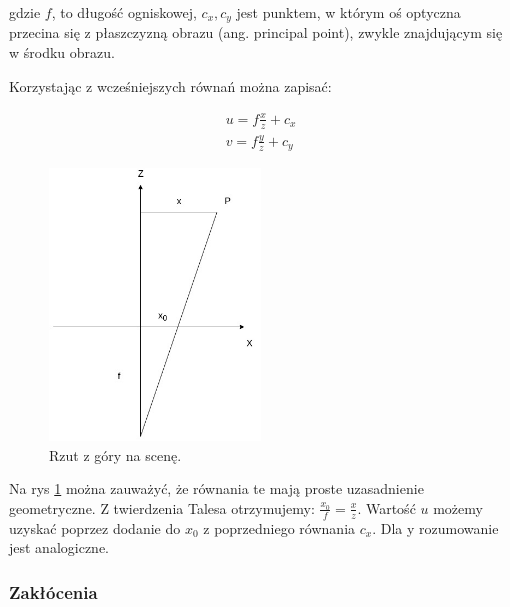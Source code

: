 \documentclass[oneside, eng]{mgr}
\begin{document}
gdzie $f$, to długość ogniskowej, $c_x, c_y$ jest punktem, w którym oś optyczna przecina się z płaszczyzną obrazu (ang. principal point), zwykle znajdującym się w środku obrazu.

Korzystając z wcześniejszych równań można zapisać:

\begin{align*}
	u = f \frac{x}{z} + c_x \\
	v = f \frac{y}{z} + c_y
\end{align*}

\begin{figure}
\centering
	\includegraphics[width=0.50\textwidth]{rzutowanie.jpg}\par\vspace{1cm}
\caption{Rzut z góry na scenę.}
	\label{fig:projection_up}
\end{figure}

Na rys \ref{fig:projection_up} można zauważyć, że równania te mają proste uzasadnienie geometryczne. Z twierdzenia Talesa otrzymujemy: 
$\frac{x_0}{f} = \frac{x}{z}$. Wartość $u$ możemy uzyskać poprzez dodanie do $x_0$ z poprzedniego równania $c_x$. Dla y rozumowanie jest analogiczne.


\subsubsection{Zakłócenia}
\end{document}
